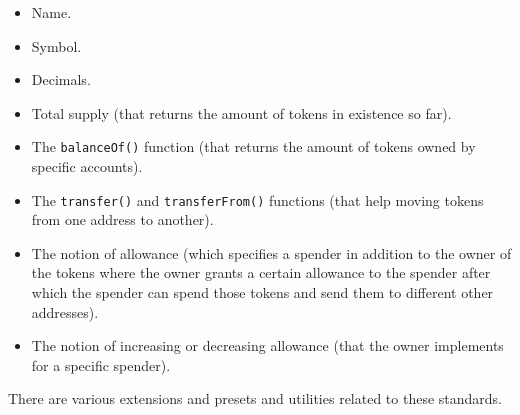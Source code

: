 \begin{itemize}
\tightlist
\item
  Name.
\item
  Symbol.
\item
  Decimals.
\item
  Total supply (that returns the amount of tokens in existence so far).
\item
  The \texttt{balanceOf()} function (that returns the amount of tokens
  owned by specific accounts).
\item
  The \texttt{transfer()} and \texttt{transferFrom()} functions (that
  help moving tokens from one address to another).
\item
  The notion of allowance (which specifies a spender in addition to the
  owner of the tokens where the owner grants a certain allowance to the
  spender after which the spender can spend those tokens and send them
  to different other addresses).
\item
  The notion of increasing or decreasing allowance (that the owner
  implements for a specific spender).
\end{itemize}

There are various extensions and presets and utilities related to these
standards.

